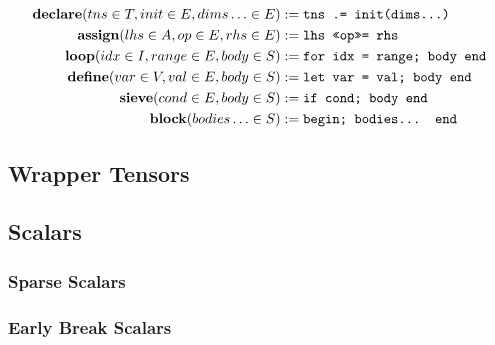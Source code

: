 \begin{align*}
    \text{\textbf{declare}}(tns \in T, init \in E, dims\ldots \in E) &:= \text{\texttt{tns .= init(dims...)}} \\
    \text{\textbf{assign}}(lhs \in A, op \in E, rhs \in E) &:= \text{\texttt{lhs \texttt{<<op>>=} rhs}} \\
    \text{\textbf{loop}}(idx \in I, range \in E, body \in S) &:= \text{\texttt{for idx = range; body end}} \\
    \text{\textbf{define}}(var \in V, val \in E, body \in S) &:= \text{\texttt{let var = val; body end}} \\
    \text{\textbf{sieve}}(cond \in E, body \in S) &:= \text{\texttt{if cond; body end}} \\
    \text{\textbf{block}}(bodies\ldots \in S) &:= \text{\texttt{begin; bodies... end}}
\end{align*}


\subsection{Wrapper Tensors}

\subsection{Scalars}

\subsubsection{Sparse Scalars}
\subsubsection{Early Break Scalars}

